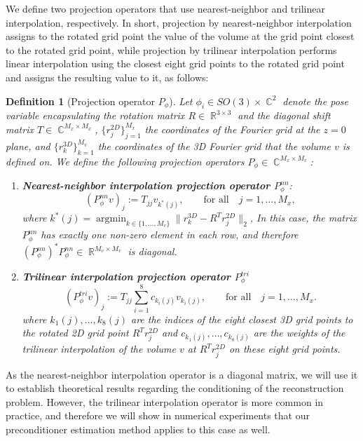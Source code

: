 \documentclass{article}
\DeclareMathOperator{\Rb}{\mathbb{R}}
\DeclareMathOperator{\Cb}{\mathbb{C}}
\DeclareMathOperator*{\argmin}{argmin}
\newtheorem{definition}[theorem]{Definition}
\begin{document}
We define two projection operators that use nearest-neighbor
and trilinear interpolation, respectively. In short, projection by nearest-neighbor 
interpolation assigns to the rotated grid point the value of the volume at the 
grid point closest to the rotated grid point, while projection by trilinear 
interpolation performs linear interpolation using the closest eight grid points 
to the rotated grid point and assigns the resulting value to it, as follows:
\begin{definition}[Projection operator $P_{\phi}$]
    \label{def:proj}
    Let $\phi_i \in SO(3) \times \Cb^2$ denote the pose variable encapsulating the
    rotation matrix $ R \in \Rb^{3 \times 3} $ 
    and the diagonal shift matrix $T \in \Cb^{M_x \times M_x}$, 
    $\{r_j^{2D}\}_{j=1}^{M_x}$ the coordinates of the Fourier grid at the $z=0$ plane,
    and $\{r_k^{3D}\}_{k=1}^{M_v}$ the coordinates of the 3D Fourier grid that the volume $v$ is defined on.
    We define the following projection operators $P_{\phi} \in \Cb^{M_x \times M_v}$:
    \begin{enumerate}
        \item \textbf{Nearest-neighbor interpolation projection operator $P^{nn}_{\phi}$}:
            \begin{equation} 
                (P^{nn}_{\phi} v)_j := T_{jj} v_{k^*(j)},
                \qquad \text{for all} \quad j = 1,\ldots, M_x,
                \label{eq:def nn interp}
            \end{equation}
            where $k^*(j) = \argmin_{k \in \{1,\ldots,M_v\}} \|r_k^{3D} - R^T r_j^{2D}\|_2 $,
            In this case, the matrix $P^{nn}_{\phi}$ has exactly one non-zero 
            element in each row, and therefore 
            ${(P^{nn}_{\phi})}^* P^{nn}_{\phi} \in \Rb^{M_v \times M_v}$ 
            is diagonal.
        \item \textbf{Trilinear interpolation projection operator $P^{tri}_{\phi}$}
            \begin{equation}
                (P^{tri}_{\phi} v)_j :=  T_{jj} \sum_{i=1}^8  c_{k_i(j)} v_{k_i(j)},
                \qquad \text{for all} \quad j=1,\ldots,M_x. 
                \label{eq:def tri interp}
            \end{equation}
            where $ k_1(j), \ldots, k_8(j) $ are the indices of the eight closest
            3D grid points to the rotated 2D grid point $R^T r_j^{2D}$ and
            $ c_{k_1(j)}, \ldots, c_{k_8(j)} $ 
            are the weights of the trilinear interpolation of the volume $v$
            at $R^T r_j^{2D}$ on these eight grid points.
    \end{enumerate}
\end{definition}
As the nearest-neighbor interpolation operator is a diagonal matrix, we will use 
it to establish theoretical results regarding the conditioning of the reconstruction
problem. However, the trilinear interpolation operator is more common in practice, 
and therefore we will show in numerical experiments that our preconditioner estimation 
method applies to this case as well.
\end{document}
